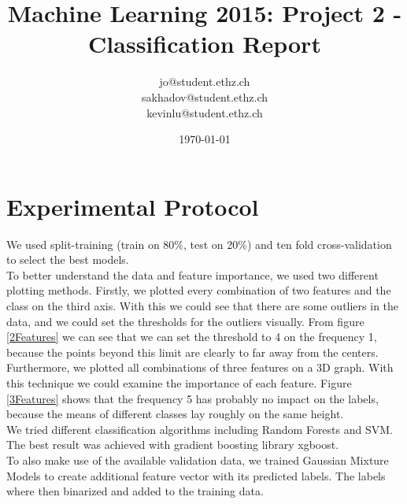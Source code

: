\documentclass[a4paper, 11pt]{article}
\title{Machine Learning 2015: Project 2 - Classification Report}
\author{jo@student.ethz.ch\\ sakhadov@student.ethz.ch\\ kevinlu@student.ethz.ch\\}
\date{\today}
\begin{document}
\maketitle

\section*{Experimental Protocol}
We used split-training (train on 80\%, test on 20\%) and ten fold cross-validation to select the best models. \\
To better understand the data and feature importance, we used two different plotting methods. Firstly, we plotted every combination of two features and the class on the third axis. With this we could see that there are some outliers in the data, and we could set the thresholds for the outliers visually. From figure \ref{2Features} we can see that we can set the threshold to 4 on the frequency 1, because the points beyond this limit are clearly to far away from the centers.\\ 
Furthermore, we plotted all combinations of three features on a 3D graph. With this technique we could examine the importance of each feature. Figure \ref{3Features} shows that the frequency 5 has probably no impact on the labels, because the means of different classes lay roughly on the same height. \\
We tried different classification algorithms including Random Forests and SVM. The best result was achieved with gradient boosting library xgboost. \\
To also make use of the available validation data, we trained Gaussian Mixture Models to create additional feature vector with its predicted labels. The labels where then binarized and added to the training data.
\end{document}
